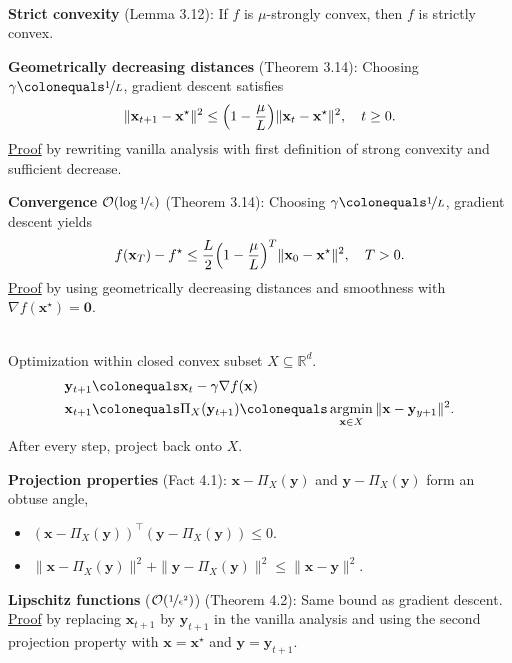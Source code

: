\documentclass{article}
\DeclareMathOperator*{\argmin}{argmin}
\newcommand{\lft}{\mathopen{}\mathclose\bgroup\left}
\newcommand{\rgt}{\aftergroup\egroup\right}
\newcommand{\R}{\mathbb{R}}
\renewcommand{\vec}[1]{\mathbf{#1}}
\newcommand{\transpose}[1]{#1^\top}
\newenvironment{topic}[1]
{\textbf{\sffamily \colorbox{black}{\rlap{\textbf{\textcolor{white}{#1}}}\hspace{\linewidth}\hspace{-2\fboxsep}}} \\ \vspace{0.2cm}}
{}
\begin{document}
\begin{multicols*}{2}
\begin{topic}{3 Strongly convex functions}
        \textbf{Strict convexity} (Lemma 3.12): If $f$ is $\mu$-strongly convex, then $f$ is strictly convex.

        \textbf{Geometrically decreasing distances} (Theorem 3.14): Choosing $\gamma \colonequals \nicefrac{1}{L}$, gradient descent satisfies \[
            \| \vec{x}_{t+1} - \vec{x}^\star \|^2 \leq \lft( 1 - \frac{\mu}{L} \rgt) \| \vec{x}_t - \vec{x}^\star \|^2, \quad t \geq 0.
        \]
        \underline{Proof} by rewriting vanilla analysis with first definition of strong convexity and
        sufficient decrease.

        \textbf{Convergence} $\mathcal{O}(\log \nicefrac{1}{\epsilon})$ (Theorem 3.14): Choosing $\gamma \colonequals \nicefrac{1}{L}$, gradient descent yields \[
            f(\vec{x}_T) - f^\star \leq \frac{L}{2} \lft( 1 - \frac{\mu}{L} \rgt)^T \| \vec{x}_0 - \vec{x}^\star \|^2, \quad T > 0.
        \]
        \underline{Proof} by using geometrically decreasing distances and smoothness with
        $\nabla f(\vec{x}^\star) = \vec{0}$.
    \end{topic}

    \begin{topic}{4 Projected gradient descent}
        Optimization within closed convex subset $X \subseteq \R^d$.
        \begin{align*}
            \vec{y}_{t+1} & \colonequals \vec{x}_t - \gamma \nabla f(\vec{x})                                                       \\
            \vec{x}_{t+1} & \colonequals \Pi_X(\vec{y}_{t+1}) \colonequals \argmin_{\vec{x} \in X} \| \vec{x} - \vec{y}_{y+1} \|^2.
        \end{align*}
        After every step, project back onto $X$.

        \textbf{Projection properties} (Fact 4.1): $\vec{x} - \Pi_X(\vec{y})$ and $\vec{y} - \Pi_X(\vec{y})$ form an obtuse angle,
        \begin{itemize}
            \item $\transpose{(\vec{x} - \Pi_X(\vec{y}))}(\vec{y} - \Pi_X(\vec{y})) \leq 0$.
            \item $\| \vec{x} - \Pi_X(\vec{y}) \|^2 + \| \vec{y} - \Pi_X(\vec{y}) \|^2 \leq \| \vec{x} - \vec{y} \|^2$.
        \end{itemize}

        \textbf{Lipschitz functions} ($\mathcal{O}(\nicefrac{1}{\epsilon^2})$) (Theorem 4.2): Same bound as gradient
        descent. \underline{Proof} by replacing $\vec{x}_{t+1}$ by $\vec{y}_{t+1}$ in the vanilla
        analysis and using the second projection property with $\vec{x} = \vec{x}^\star$ and
        $\vec{y} = \vec{y}_{t+1}$.


\end{topic}
\end{multicols*}
\end{document}
